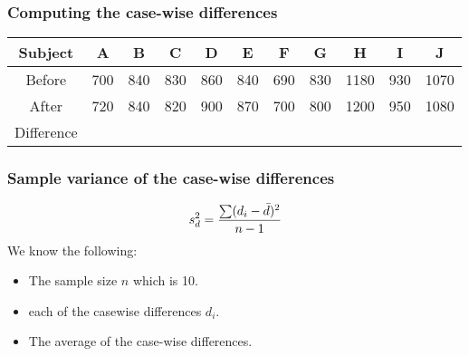 \begin{frame}
\frametitle{Computing the case-wise differences}
\begin{center}
\begin{tabular}{|c|c|c|c|c|c|c|c|c|c|c|}
\hline
Subject& A& B& C& D& E &F &G &H &I &J\\  \hline
Before &700& 840& 830& 860& 840 &690 &830& 1180& 930& 1070\\  \hline
After &720 &840 &820 &900 &870 &700 &800& 1200& 950& 1080\\  \hline
Difference &  & & & & & & & & & \\
\hline
\end{tabular}
\end{center}
\end{frame}
\begin{frame}
\frametitle{Sample variance of the case-wise differences}
\Large
\[s_d^2 = {\sum ( d_i - \bar{d})^2\over n-1}\]
We know the following:
\begin{itemize}
\item The sample size $n$ which is 10.
\item each of the casewise differences $d_i$.
\item The average of the case-wise differences.
\end{itemize}
\end{frame}
